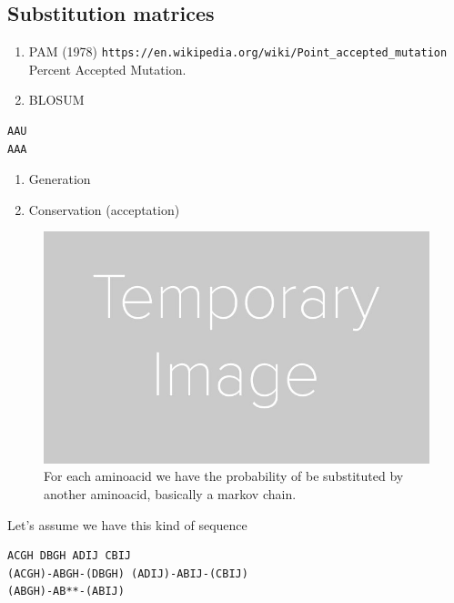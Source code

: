\documentclass[11pt]{article}
\begin{document}
\subsection{Substitution matrices} %
\label{sub:substitution_matrices}
\begin{enumerate}
	\item PAM (1978) \texttt{https://en.wikipedia.org/wiki/Point\_accepted\_mutation} Percent Accepted Mutation.
	\item BLOSUM 
\end{enumerate}



\begin{lstlisting}
AAU
AAA
\end{lstlisting}
\begin{enumerate}
	\item Generation
	\item Conservation (acceptation)
\end{enumerate}


\begin{figure}[tb]
	\centering
	\includegraphics[scale=0.3]{image.jpg}
	\caption{For each aminoacid we  have the probability of be substituted by another aminoacid, basically a markov chain.}
	\label{fig:figure1}
\end{figure}



Let's assume we have this kind of sequence

\begin{lstlisting}
ACGH DBGH ADIJ CBIJ
(ACGH)-ABGH-(DBGH) (ADIJ)-ABIJ-(CBIJ)
(ABGH)-AB**-(ABIJ)
\end{lstlisting}
\end{document}

